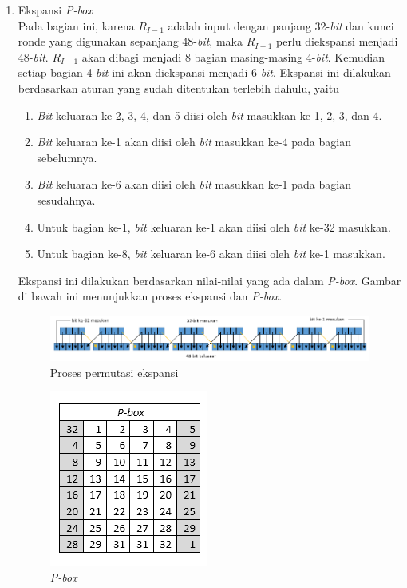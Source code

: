 \begin{enumerate}
	\item Ekspansi \textit{P-box}\\
	Pada bagian ini, karena \begin{math}R_{I-1}\end{math} adalah input dengan panjang 32-\textit{bit} dan kunci ronde yang digunakan sepanjang 48-\textit{bit}, maka \begin{math}R_{I-1}\end{math} perlu diekspansi menjadi 48-\textit{bit}. \begin{math}R_{I-1}\end{math} akan dibagi menjadi 8 bagian masing-masing 4-\textit{bit}. Kemudian setiap bagian 4-\textit{bit} ini akan diekspansi menjadi 6-\textit{bit}. Ekspansi ini dilakukan berdasarkan aturan yang sudah ditentukan terlebih dahulu, yaitu
	\begin{enumerate}
		\item \textit{Bit} keluaran ke-2, 3, 4, dan 5 diisi oleh \textit{bit} masukkan ke-1, 2, 3, dan 4.
		\item \textit{Bit} keluaran ke-1 akan diisi oleh \textit{bit} masukkan ke-4 pada bagian sebelumnya.
		\item \textit{Bit} keluaran ke-6 akan diisi oleh \textit{bit} masukkan ke-1 pada bagian sesudahnya.
		\item Untuk bagian ke-1, \textit{bit} keluaran ke-1 akan diisi oleh \textit{bit} ke-32 masukkan.
		\item Untuk bagian ke-8, \textit{bit} keluaran ke-6 akan diisi oleh \textit{bit} ke-1 masukkan.
	\end{enumerate}
	Ekspansi ini dilakukan berdasarkan nilai-nilai yang ada dalam \textit{P-box}. Gambar di bawah ini menunjukkan proses ekspansi dan \textit{P-box}.
	
	\begin{figure}[h]
	\includegraphics[scale=0.5]{Gambar/expansion_permutation}
	\centering
	\caption{Proses permutasi ekspansi}
	\end{figure}
	
\begin{figure}[h]
	\includegraphics[scale=0.8]{Gambar/P-box}
	\centering
	\caption{\textit{P-box}}
\end{figure}


\end{enumerate}
